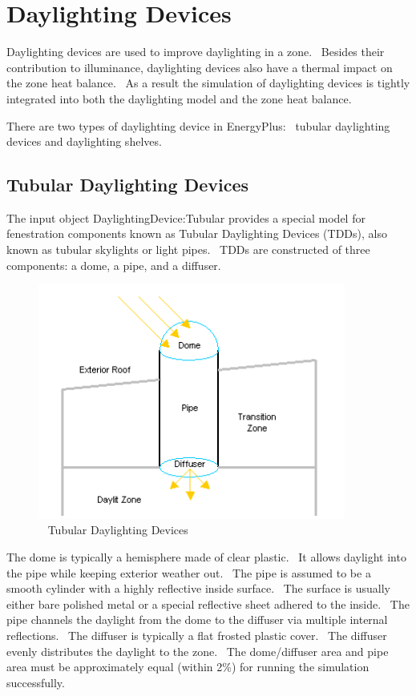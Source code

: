 \section{Daylighting Devices}\label{daylighting-devices}

Daylighting devices are used to improve daylighting in a zone.~ Besides their contribution to illuminance, daylighting devices also have a thermal impact on the zone heat balance.~ As a result the simulation of daylighting devices is tightly integrated into both the daylighting model and the zone heat balance.

There are two types of daylighting device in EnergyPlus:~ tubular daylighting devices and daylighting shelves.

\subsection{Tubular Daylighting Devices}\label{tubular-daylighting-devices}

The input object DaylightingDevice:Tubular provides a special model for fenestration components known as Tubular Daylighting Devices (TDDs), also known as tubular skylights or light pipes.~ TDDs are constructed of three components: a dome, a pipe, and a diffuser.

\begin{figure}[hbtp] %
\centering
\includegraphics[width=0.9\textwidth, height=0.9\textheight, keepaspectratio=true]{media/image869.png}
\caption{  Tubular Daylighting Devices \protect \label{fig:tubular-daylighting-devices}}
\end{figure}

The dome is typically a hemisphere made of clear plastic.~ It allows daylight into the pipe while keeping exterior weather out.~ The pipe is assumed to be a smooth cylinder with a highly reflective inside surface.~ The surface is usually either bare polished metal or a special reflective sheet adhered to the inside.~ The pipe channels the daylight from the dome to the diffuser via multiple internal reflections.~ The diffuser is typically a flat frosted plastic cover.~ The diffuser evenly distributes the daylight to the zone.~ The dome/diffuser area and pipe area must be approximately equal (within 2\%) for running the simulation successfully.

